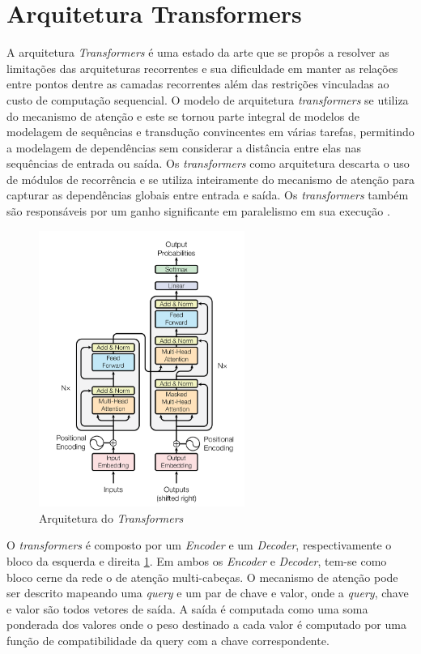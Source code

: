 \section{Arquitetura Transformers}

A arquitetura \textit{Transformers} é uma estado da arte que se propôs a resolver as limitações das arquiteturas recorrentes e sua dificuldade em manter as relações entre pontos dentre as camadas recorrentes além das restrições vinculadas ao custo de computação sequencial. O modelo de arquitetura \textit{transformers} se utiliza do mecanismo de atenção e este se tornou parte integral de modelos de modelagem de sequências e transdução convincentes em várias tarefas, permitindo a modelagem de dependências sem considerar a distância entre elas nas sequências de entrada ou saída. Os \textit{transformers} como arquitetura descarta o uso de módulos de recorrência e se utiliza inteiramente do mecanismo de atenção para capturar as dependências globais entre entrada e saída. Os \textit{transformers} também são responsáveis por um ganho significante em paralelismo em sua execução \cite{vaswaniAttentionAllYou2023}.

\begin{figure}[htbp]
    \centering
    \includegraphics[width=0.6\textwidth]{figures/fig004.png}
    \caption{Arquitetura do \textit{Transformers}}
    \label{fig:fig004}
\end{figure}

O \textit{transformers} é composto por um \textit{Encoder} e um \textit{Decoder}, respectivamente o bloco da esquerda e direita \ref{fig:fig004}. Em ambos os \textit{Encoder} e \textit{Decoder}, tem-se como bloco cerne da rede o de atenção multi-cabeças. O mecanismo de atenção pode ser descrito mapeando uma \textit{query} e um par de chave e valor, onde a \textit{query}, chave e valor são todos vetores de saída. A saída é computada como uma soma ponderada dos valores onde o peso destinado a cada valor é computado por uma função de compatibilidade da query com a chave correspondente.

